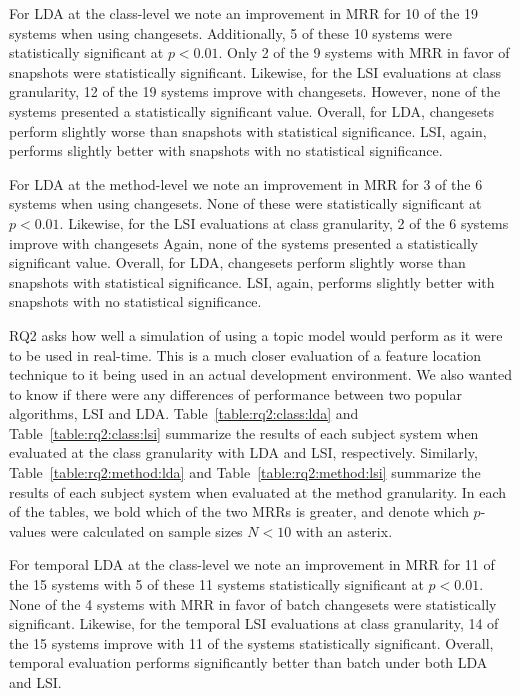 For LDA at the class-level we note an improvement in MRR for 10 of the 19
systems when using changesets.  Additionally, 5 of these 10 systems were
statistically significant at $p<0.01$.  Only 2 of the 9 systems with MRR in
favor of snapshots were statistically significant.  Likewise, for the LSI
evaluations at class granularity, 12 of the 19 systems improve with changesets.
However, none of the systems presented a statistically significant value.
Overall, for LDA, changesets perform slightly worse than snapshots with
statistical significance.  LSI, again, performs slightly better with snapshots
with no statistical significance.

For LDA at the method-level we note an improvement in MRR for 3 of the 6
systems when using changesets.  None of these were statistically significant at
$p<0.01$.  Likewise, for the LSI evaluations at class granularity, 2 of the 6
systems improve with changesets Again, none of the systems presented a
statistically significant value.  Overall, for LDA, changesets perform slightly
worse than snapshots with statistical significance.  LSI, again, performs
slightly better with snapshots with no statistical significance.








RQ2 asks how well a simulation of using a topic model would perform as it were
to be used in real-time.  This is a much closer evaluation of a feature
location technique to it being used in an actual development environment.  We
also wanted to know if there were any differences of performance between two
popular algorithms, LSI and LDA.  Table~\ref{table:rq2:class:lda} and
Table~\ref{table:rq2:class:lsi} summarize the results of each subject system
when evaluated at the class granularity with LDA and LSI, respectively.
Similarly, Table~\ref{table:rq2:method:lda} and
Table~\ref{table:rq2:method:lsi} summarize the results of each subject system
when evaluated at the method granularity.  In each of the tables, we bold which
of the two MRRs is greater, and denote which $p$-values were calculated on
sample sizes $N<10$ with an asterix.

For temporal LDA at the class-level we note an improvement in MRR for 11 of the
15 systems with 5 of these 11 systems statistically significant at $p<0.01$.
None of the 4 systems with MRR in favor of batch changesets were statistically
significant.  Likewise, for the temporal LSI evaluations at class granularity,
14 of the 15 systems improve with 11 of the systems statistically significant.
Overall, temporal evaluation performs significantly better than batch under
both LDA and LSI.



